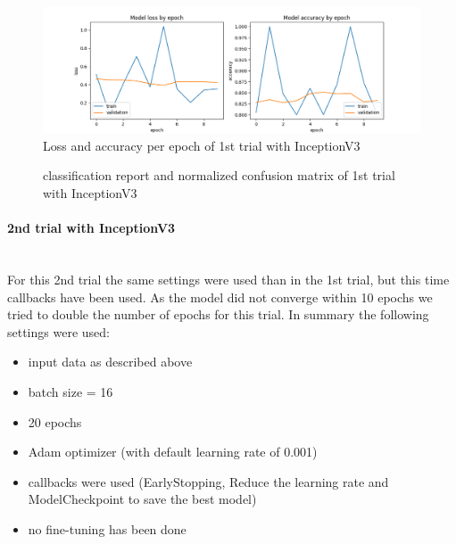 \documentclass{article}
\begin{document}
\begin{figure}[ht] %
    \centering
    \includegraphics[width=1.0\linewidth]{inceptionv3_04_loss_accuracy.png}
    \caption{Loss and accuracy per epoch of 1st trial with InceptionV3}
    \label{fig:inceptionv3_04_loss_accuracy}
\end{figure}

\begin{figure}[ht]
  \centering
  \qquad
  \caption{classification report and normalized confusion matrix of 1st trial with InceptionV3}
  \label{fig:inceptionv3_04_results}
\end{figure}



\paragraph{2nd trial with InceptionV3}\mbox{}\\
For this 2nd trial the same settings were used than in the 1st trial, but this time callbacks have been used. As the model did not converge within 10 epochs we tried to double the number of epochs for this trial. In summary the following settings were used: 
\begin{itemize}
\item input data as described above
\item batch size = 16
\item 20 epochs 
\item Adam optimizer (with default learning rate of 0.001)
\item callbacks were used (EarlyStopping, Reduce the learning rate and ModelCheckpoint to save the best model)
\item no fine-tuning has been done
\end{itemize}
\end{document}
